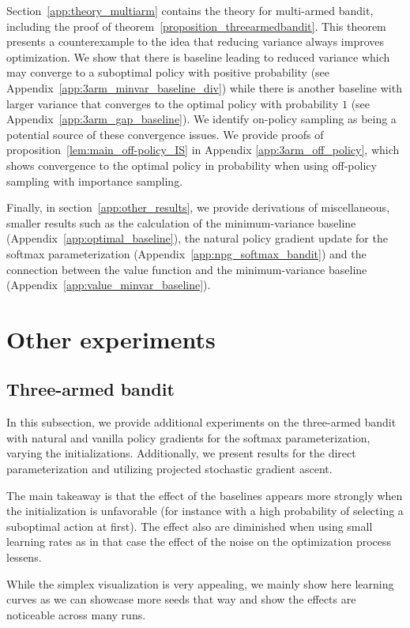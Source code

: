 Section~\ref{app:theory_multiarm} contains the theory for multi-armed bandit, including the proof of theorem~\ref{proposition_threearmedbandit}. This theorem presents a counterexample to the idea that reducing variance always improves optimization. We show that there is baseline leading to reduced variance which may converge to a suboptimal policy with positive probability (see Appendix~\ref{app:3arm_minvar_baseline_div}) while there is another baseline with larger variance that converges to the optimal policy with probability $1$ (see Appendix~\ref{app:3arm_gap_baseline}).
We identify on-policy sampling as being a potential source of these convergence issues. We provide proofs of proposition~\ref{lem:main_off-policy_IS} in Appendix \ref{app:3arm_off_policy}, which shows convergence to the optimal policy in probability when using off-policy sampling with importance sampling.  

Finally, in section~\ref{app:other_results}, we provide derivations of miscellaneous, smaller results such as the calculation of the minimum-variance baseline (Appendix~\ref{app:optimal_baseline}), the natural policy gradient update for the softmax parameterization (Appendix~\ref{app:npg_softmax_bandit}) and the connection between the value function and the minimum-variance baseline  (Appendix~\ref{app:value_minvar_baseline}).

\section{Other experiments}
\label{app:exp}

\subsection{Three-armed bandit}
\label{app:exp_3armbandit}
In this subsection, we provide additional experiments on the three-armed bandit with natural and vanilla policy gradients for the softmax parameterization, varying the initializations.  Additionally, we present results for the direct parameterization and utilizing projected stochastic gradient ascent. 

The main takeaway is that the effect of the baselines appears more strongly when the initialization is unfavorable (for instance with a high probability of selecting a suboptimal action at first). The effect also are diminished when using small learning rates as in that case the effect of the noise on the optimization process lessens.

While the simplex visualization is very appealing, we mainly show here learning curves as we can showcase more seeds that way and show the effects are noticeable across many runs.

